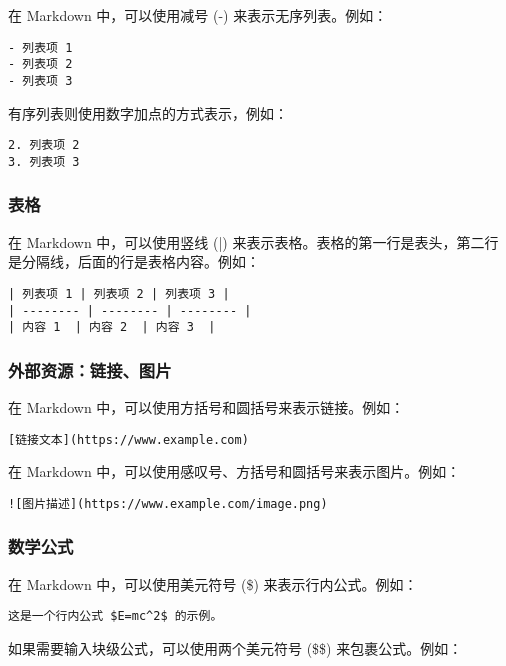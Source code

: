 \documentclass[../main.tex]{subfiles}
\begin{document}
在 Markdown 中，可以使用减号 (-) 来表示无序列表。例如：

\begin{lstlisting}
- 列表项 1
- 列表项 2
- 列表项 3
\end{lstlisting}

有序列表则使用数字加点的方式表示，例如：

\begin{lstlisting}
2. 列表项 2
3. 列表项 3
\end{lstlisting}

\subsubsection{表格}

在 Markdown 中，可以使用竖线 (|) 来表示表格。表格的第一行是表头，第二行是分隔线，后面的行是表格内容。例如：

\begin{lstlisting}
| 列表项 1 | 列表项 2 | 列表项 3 |
| -------- | -------- | -------- |
| 内容 1  | 内容 2  | 内容 3  |
\end{lstlisting}

\subsubsection{外部资源：链接、图片}

在 Markdown 中，可以使用方括号和圆括号来表示链接。例如：

\begin{lstlisting}
[链接文本](https://www.example.com)
\end{lstlisting}

在 Markdown 中，可以使用感叹号、方括号和圆括号来表示图片。例如：

\begin{lstlisting}
![图片描述](https://www.example.com/image.png)
\end{lstlisting}

\subsubsection{数学公式}

在 Markdown 中，可以使用美元符号 (\$) 来表示行内公式。例如：

\begin{lstlisting}
这是一个行内公式 $E=mc^2$ 的示例。
\end{lstlisting}

如果需要输入块级公式，可以使用两个美元符号 (\$\$) 来包裹公式。例如：
\end{document}
